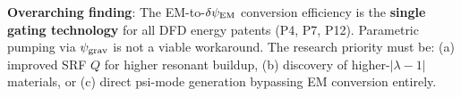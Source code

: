 \documentclass[11pt]{article}
\newcommand{\psigrav}{\psi_{\rm grav}}
\newcommand{\dpsiEM}{\delta\psi_{\rm EM}}
\newcommand{\lambdaone}{|\lambda{-}1|}
\begin{document}
\begin{tcolorbox}[colback=green!5!white, colframe=green!60!black,
  title=\textbf{W3i7 P4+P7+P12 Bottom Line}]
\medskip

\textbf{Overarching finding}: The EM-to-$\dpsiEM$ conversion efficiency
is the \textbf{single gating technology} for all DFD energy patents
(P4, P7, P12). Parametric pumping via $\psigrav$ is not a viable
workaround. The research priority must be: (a) improved SRF $Q$ for
higher resonant buildup, (b) discovery of higher-$\lambdaone$ materials,
or (c) direct psi-mode generation bypassing EM conversion entirely.
\end{tcolorbox}
\end{document}
